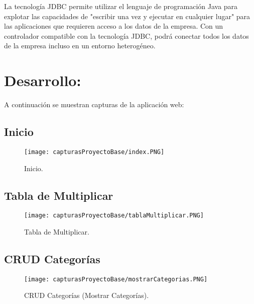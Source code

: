 \documentclass[titlepage, 12pt]{article}
\begin{document}
La tecnología JDBC permite utilizar el lenguaje de programación Java para explotar las capacidades de "escribir una vez y ejecutar en cualquier lugar" para las aplicaciones que requieren acceso a los datos de la empresa. Con un controlador compatible con la tecnología JDBC, podrá conectar todos los datos de la empresa incluso en un entorno heterogéneo.

\pagebreak

\section{Desarrollo:}

A continuación se muestran capturas de la aplicación web:

\subsection{Inicio}
    \begin{figure}[h]
        \caption{Inicio.}
        \centering
        \texttt{[image: capturasProyectoBase/index.PNG]} \par\vspace{0.5cm}
    \end{figure}

\subsection{Tabla de Multiplicar}   
    \begin{figure}[h]
        \caption{Tabla de Multiplicar.}
        \centering
        \texttt{[image: capturasProyectoBase/tablaMultiplicar.PNG]} \par\vspace{0.5cm}
    \end{figure}
    
    \clearpage

\subsection{CRUD Categorías}
    \begin{figure}[h]
        \caption{CRUD Categorías (Mostrar Categorías).}
        \centering
        \texttt{[image: capturasProyectoBase/mostrarCategorias.PNG]} \par\vspace{0.5cm}
    \end{figure}
    
\end{document}
